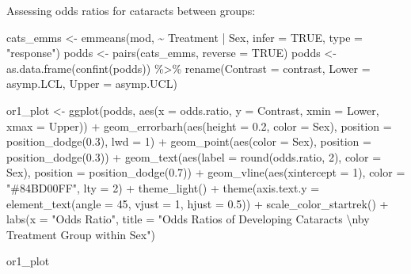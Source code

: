 \documentclass[
]{article}
\newenvironment{Shaded}{\begin{snugshade}}{\end{snugshade}}
\newcommand{\AttributeTok}[1]{\textcolor[rgb]{0.77,0.63,0.00}{#1}}
\newcommand{\ConstantTok}[1]{\textcolor[rgb]{0.00,0.00,0.00}{#1}}
\newcommand{\DecValTok}[1]{\textcolor[rgb]{0.00,0.00,0.81}{#1}}
\newcommand{\FloatTok}[1]{\textcolor[rgb]{0.00,0.00,0.81}{#1}}
\newcommand{\FunctionTok}[1]{\textcolor[rgb]{0.00,0.00,0.00}{#1}}
\newcommand{\NormalTok}[1]{#1}
\newcommand{\OtherTok}[1]{\textcolor[rgb]{0.56,0.35,0.01}{#1}}
\newcommand{\SpecialCharTok}[1]{\textcolor[rgb]{0.00,0.00,0.00}{#1}}
\newcommand{\StringTok}[1]{\textcolor[rgb]{0.31,0.60,0.02}{#1}}
\begin{document}
Assessing odds ratios for cataracts between groups:

\begin{Shaded}
\begin{Highlighting}[]
\NormalTok{cats\_emms }\OtherTok{\textless{}{-}} \FunctionTok{emmeans}\NormalTok{(mod, }\SpecialCharTok{\textasciitilde{}}\NormalTok{ Treatment }\SpecialCharTok{|}\NormalTok{ Sex, }\AttributeTok{infer =} \ConstantTok{TRUE}\NormalTok{, }\AttributeTok{type =} \StringTok{"response"}\NormalTok{)}
\NormalTok{podds }\OtherTok{\textless{}{-}} \FunctionTok{pairs}\NormalTok{(cats\_emms, }\AttributeTok{reverse =} \ConstantTok{TRUE}\NormalTok{)}
\NormalTok{podds }\OtherTok{\textless{}{-}} \FunctionTok{as.data.frame}\NormalTok{(}\FunctionTok{confint}\NormalTok{(podds)) }\SpecialCharTok{\%\textgreater{}\%}
  \FunctionTok{rename}\NormalTok{(}\AttributeTok{Contrast =}\NormalTok{ contrast, }\AttributeTok{Lower =}\NormalTok{ asymp.LCL, }\AttributeTok{Upper =}\NormalTok{ asymp.UCL)}

\NormalTok{or1\_plot }\OtherTok{\textless{}{-}} \FunctionTok{ggplot}\NormalTok{(podds, }\FunctionTok{aes}\NormalTok{(}\AttributeTok{x =}\NormalTok{ odds.ratio, }\AttributeTok{y =}\NormalTok{ Contrast, }\AttributeTok{xmin =}\NormalTok{ Lower, }\AttributeTok{xmax =}\NormalTok{ Upper)) }\SpecialCharTok{+}
  \FunctionTok{geom\_errorbarh}\NormalTok{(}\FunctionTok{aes}\NormalTok{(}\AttributeTok{height =} \FloatTok{0.2}\NormalTok{, }\AttributeTok{color =}\NormalTok{ Sex),}
                 \AttributeTok{position =} \FunctionTok{position\_dodge}\NormalTok{(}\FloatTok{0.3}\NormalTok{), }\AttributeTok{lwd =} \DecValTok{1}\NormalTok{) }\SpecialCharTok{+}
  \FunctionTok{geom\_point}\NormalTok{(}\FunctionTok{aes}\NormalTok{(}\AttributeTok{color =}\NormalTok{ Sex), }\AttributeTok{position =} \FunctionTok{position\_dodge}\NormalTok{(}\FloatTok{0.3}\NormalTok{)) }\SpecialCharTok{+}
  \FunctionTok{geom\_text}\NormalTok{(}\FunctionTok{aes}\NormalTok{(}\AttributeTok{label =} \FunctionTok{round}\NormalTok{(odds.ratio, }\DecValTok{2}\NormalTok{), }\AttributeTok{color =}\NormalTok{ Sex), }\AttributeTok{position =} \FunctionTok{position\_dodge}\NormalTok{(}\FloatTok{0.7}\NormalTok{)) }\SpecialCharTok{+} 
  \FunctionTok{geom\_vline}\NormalTok{(}\FunctionTok{aes}\NormalTok{(}\AttributeTok{xintercept =} \DecValTok{1}\NormalTok{), }\AttributeTok{color =} \StringTok{"\#84BD00FF"}\NormalTok{, }\AttributeTok{lty =} \DecValTok{2}\NormalTok{) }\SpecialCharTok{+}
  \FunctionTok{theme\_light}\NormalTok{() }\SpecialCharTok{+}
  \FunctionTok{theme}\NormalTok{(}\AttributeTok{axis.text.y =} \FunctionTok{element\_text}\NormalTok{(}\AttributeTok{angle =} \DecValTok{45}\NormalTok{, }\AttributeTok{vjust =} \DecValTok{1}\NormalTok{, }\AttributeTok{hjust =} \FloatTok{0.5}\NormalTok{)) }\SpecialCharTok{+}
  \FunctionTok{scale\_color\_startrek}\NormalTok{() }\SpecialCharTok{+}
  \FunctionTok{labs}\NormalTok{(}\AttributeTok{x =} \StringTok{"Odds Ratio"}\NormalTok{,}
       \AttributeTok{title =} \StringTok{"Odds Ratios of Developing Cataracts }\SpecialCharTok{\textbackslash{}n}\StringTok{by Treatment Group within Sex"}\NormalTok{)}

\NormalTok{or1\_plot}
\end{Highlighting}
\end{Shaded}
\end{document}
